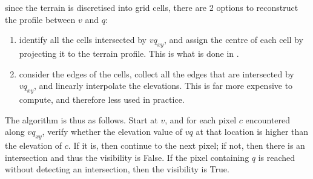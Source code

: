 since the terrain is discretised into grid cells, there are 2 options to reconstruct the profile between $v$ and $q$:
\begin{enumerate}
  \item identify all the cells intersected by $vq_{xy}$, and assign the centre of each cell by projecting it to the terrain profile. This is what is done in .
  \item consider the edges of the cells, collect all the edges that are intersected by $vq_{xy}$, and linearly interpolate the elevations. This is far more expensive to compute, and therefore less used in practice.
\end{enumerate}

The algorithm is thus as follows.
Start at $v$, and for each pixel $c$ encountered along $vq_{xy}$, verify whether the elevation value of $vq$ at that location is higher than the elevation of $c$.
If it is, then continue to the next pixel; if not, then there is an intersection and thus the visibility is False.
If the pixel containing $q$ is reached without detecting an intersection, then the visibility is True.


